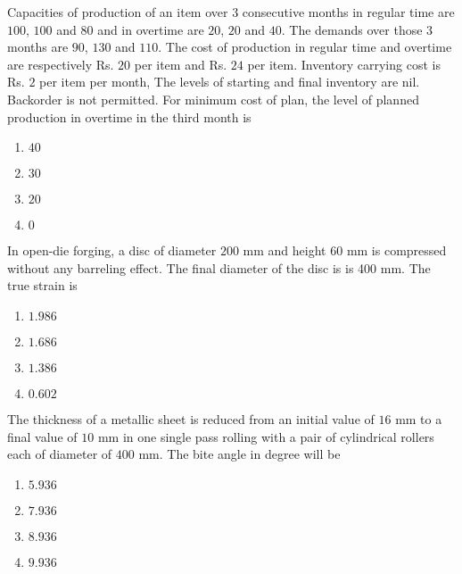     \item Capacities of production of an item over $3$ consecutive months in regular time are $100$, $100$ and $80$ and in overtime are $20$, $20$ and $40$. The demands over those $3$ months are $90$, $130$ and $110$. The cost of production in regular time and overtime are respectively Rs. $20$ per item and Rs. $24$ per item. Inventory carrying cost is Rs. $2$ per item per month, The levels of starting and final inventory are nil. Backorder is not permitted. For minimum cost of plan, the level of planned production in overtime in the third month is
    \begin{multicols}{4}
        \begin{enumerate}
            \item $40$
            \item $30$
            \item $20$
            \item $0$
        \end{enumerate}
    \end{multicols}

    \item In open-die forging, a disc of diameter $200$ mm and height $60$ mm is compressed without any barreling effect. The final diameter of the disc is is 400 mm. The true strain is 
    \begin{multicols}{4}
        \begin{enumerate}
            \item $1.986$
            \item $1.686$
            \item $1.386$
            \item $0.602$
        \end{enumerate}
    \end{multicols}

    \item The thickness of a metallic sheet is reduced from an initial value of $16$ mm to a final value of $10$ mm in one single pass rolling with a pair of cylindrical rollers each of diameter of $400$ mm. The bite angle in degree will be
    \begin{multicols}{4}
        \begin{enumerate}
            \item $5.936$
            \item $7.936$
            \item $8.936$
            \item $9.936$
        \end{enumerate}
    \end{multicols}

